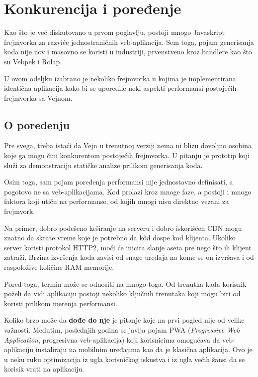 \chapter{Konkurencija i poređenje}

Kao što je već diskutovano u prvom poglavlju, postoji mnogo Javaskript frejmvorka za razviće jednostraničnih veb-aplikacija.
Sem toga, pojam generisanja koda nije nov i masovno se koristi u industriji, prvenstveno kroz bandlere kao što su Vebpek i Rolap.

U ovom odeljku izabrano je nekoliko frejmvorka u kojima je implementirana identična  aplikacija kako bi se uporedile neki aspekti performansi postojećih frejmvorka sa Vejnom.

\section{O poređenju}

Pre svega, treba istaći da Vejn u trenutnoj verziji nema ni blizu dovoljno osobina koje ga mogu čini konkurentom postojećih frejmvorka.
U pitanju je prototip koji služi za demonstraciju statičke analize prilikom generisanja koda.

Osim toga, sam pojam poređenja performansi nije jednostavno definisati, a pogotovo ne sa veb-aplikacijama.
Kod prolazi kroz mnoge faze, a postoji i mnogo faktora koji utiču na performanse, od kojih mnogi nisu direktno vezani za frejmvork.

Na primer, dobro podešeno keširanje na serveru i dobro iskorišćen CDN mogu znatno da skrate vreme koje je potrebno da kôd dospe kod klijenta.
Ukoliko server koristi protokol HTTP2, moći će inicira slanje aseta pre nego što ih klijent zatraži.
Brzina izvršenja koda zavisi od snage uređaja na kome se on izvršava i od raspoložive količine RAM memorije.

Pored toga, termin  može se odnositi na mnogo toga.
Od trenutka kada korisnik poželi da vidi aplikaciju postoji nekoliko ključnih trenutaka koji mogu biti od koristi prilikom merenja performansi.

Koliko brzo može da \textbf{dođe do nje} je pitanje koje na prvi pogled nije od velike važnosti.
Međutim, poslednjih godina se javlja pojam PWA (\textsl{Progressive Web Application}, progresivna veb-aplikacija) koji korisnicima omogućava da veb-aplikaciju instaliraju na mobilnim uređajima kao da je klasična aplikacija.
Ovo je u neku ruku optimizacija iz ugla korisničkog iskustva i iz ugla većih šansi da se korisik vrati na aplikaciju.

